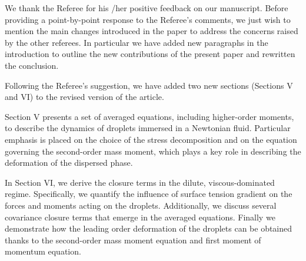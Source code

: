 \documentclass[10pt,a4paper]{article}
\newcommand{\tb}[1]{\color{blue}#1\color{black}}
\begin{document}
\tb{
    We thank the Referee for his /her positive feedback on our manuscript. 
    Before providing a point-by-point response to the Referee’s comments, we just wish to mention the main changes introduced in the paper to address the concerns raised by the other referees.
    In particular we have added new paragraphs in the introduction to outline the new contributions of the present paper and rewritten the conclusion.



Following the Referee’s suggestion, we have added two new sections (Sections V and VI) to the revised version of the article.

Section V presents a set of averaged equations, including higher-order moments, to describe the dynamics of droplets immersed in a Newtonian fluid. 
Particular emphasis is placed on the choice of the stress decomposition and on the equation governing the second-order mass moment, which plays a key role in describing the deformation of the dispersed phase.

In Section VI, we derive the closure terms in the dilute, viscous-dominated regime. 
Specifically, we quantify the influence of surface tension gradient on the forces and moments acting on the droplets. 
Additionally, we discuss several covariance closure terms that emerge in the averaged equations.
Finally we demonstrate how the leading order deformation of the droplets can be obtained thanks to the second-order mass moment equation and first moment of momentum equation.


}
\end{document}
